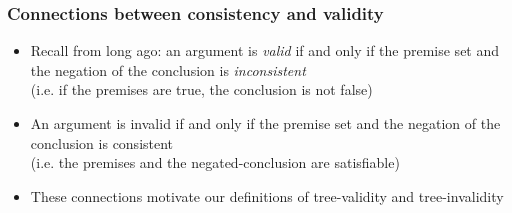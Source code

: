 \begin{frame}
\frametitle{Connections between consistency and validity}

\begin{itemize}[<+->]


\item Recall from long ago: an argument is \emph{valid} if and only if the premise set and the negation of the conclusion is \emph{inconsistent} \\ (i.e. if the premises are true, the conclusion is not false)

\item An argument is \textcolor{OGlyallpink}{invalid} if and only if the premise set and the negation of the conclusion is \textcolor{OGlyallpink}{consistent} \\ (i.e. the premises and the negated-conclusion are satisfiable)

\item These connections motivate our definitions of tree-validity and tree-invalidity

\end{itemize}
\end{frame}

